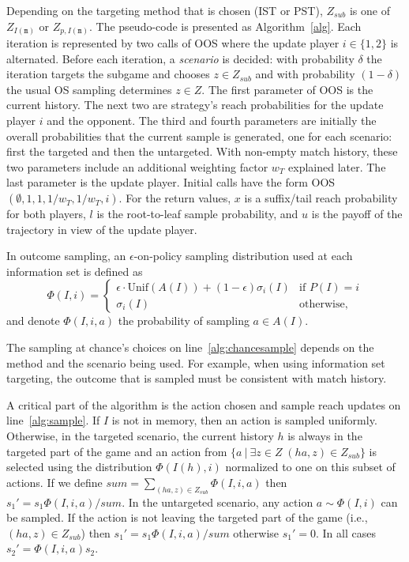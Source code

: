 \documentclass{aamas2015}
\newcommand{\ttm}{\mathtt{m}}
\begin{document}
Depending on the targeting method that is chosen (IST or PST), $Z_{sub}$ is one of $Z_{I(\ttm)}$ or $Z_{p,I(\ttm)}$. 
The pseudo-code is presented as Algorithm~\ref{alg}. 
Each iteration is represented by two calls of OOS where the update player $i \in \{1,2\}$ is alternated. 
Before each iteration, a {\it scenario} is decided: 
with probability $\delta$ the iteration targets the subgame and chooses $z \in Z_{sub}$
and with probability $(1-\delta)$ the usual OS sampling determines $z \in Z$. 
The first parameter of OOS is the current history. 
The next two are strategy's reach probabilities for the update player $i$ and the opponent. 
The third and fourth parameters are initially the overall probabilities that the current sample is generated, one for each scenario: first the targeted and then the untargeted.
With non-empty match history, these two parameters include an additional weighting factor $w_T$ explained later.
The last parameter is the update player. Initial calls have the form OOS$(\emptyset, 1, 1, 1/w_T, 1/w_T, i)$.  
For the return values, $x$ is a suffix/tail reach probability for both players, 
$l$ is the root-to-leaf sample probability, and $u$ is the payoff of the trajectory in view 
of the update player. 

In outcome sampling, an $\epsilon$-on-policy sampling distribution used at each information set
is defined as 
\begin{equation*}
\label{eq:ossample}
\Phi(I,i) = \left\{
\begin{array}{ll}
\epsilon \cdot \mbox{Unif}(A(I)) + (1-\epsilon)\sigma_i(I) & \mbox{if } P(I) = i\\ 
\sigma_i(I)                                          & \mbox{otherwise,}
\end{array} \right.
\end{equation*}
and denote $\Phi(I,i,a)$ the probability of sampling $a \in A(I)$. 

The sampling at chance's choices on line~\ref{alg:chancesample} depends on the method and the scenario being used. For example, when using information set targeting, the outcome that is sampled must be consistent with match history.

A critical part of the algorithm is the action chosen and sample reach updates on line~\ref{alg:sample}. If $I$ is not in memory, then an action is sampled uniformly. Otherwise, in the targeted scenario, the current history $h$ is always in the targeted part of the game and an action from $\{a~|~\exists z\in Z \; (ha,z)\in Z_{sub}\}$ is selected using the distribution $\Phi(I(h),i)$ normalized to one on this subset of actions. If we define $sum=\sum_{(ha,z)\in Z_{sub}}\Phi(I,i,a)$ then $s_1' = s_1\Phi(I,i,a)/sum$. In the untargeted scenario, any action $a \sim \Phi(I,i)$ can be sampled. If the action is not leaving the targeted part of the game (i.e., $(ha,z)\in Z_{sub}$) then $s_1' = s_1\Phi(I,i,a)/sum$ otherwise $s_1'=0$. In all cases $s_2' = \Phi(I,i,a) s_2$.
\end{document}
